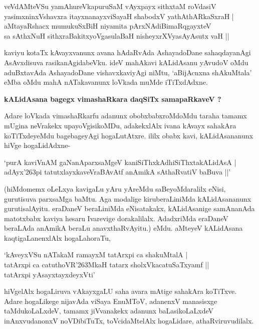 \begin{shloka}
veVdAMteVSu yamAhureVkapuruSaM vAyxpayx sithxtaM roVdasiV\\
yasimxninxVshavxra itayxnanayxviSayaH shabodxV yathAthARkaSxraH |\\
aMtayaRshacx mumukuSxBiH niyamita pArxNAdiBimaRqgayxteV \\
sa sAthxNuH sithxraBakitxyoVgasulaBaH nisheyxrXVyasAyAsutx vaH ||
\end{shloka}

kaviyu kotaTx kAvayxvanunx avana hAdaRvAda AshayadoDane sahaqdayanAgi AsAvxdisuva rasikanAgidabeVku. ideV mahAkavi kALidAsanu yAvudoV oMdu aduBxtavAda AshayadoDane vishavxkaviyAgi niMtu, `aBijAcnxna shAkuMtala' eMba oMdu mahA nATakavanunx loVkada muMde iTiTxdAdxne.

{\bf kALidAsana bagegx vimashaRkara daqSiTx samapaRkaveV ?}

Adare loVkada vimashaRkarfu adanunx obobxbabxroMdoMdu taraha tamamx mUgina neVrakekx upayoVgisikoMDu, adakekxlAlx ivana kAvayx sahakAra koTiTxdeyeMdu bagebageyAgi hogaLutAtxre. ililx obabx kavi, kALidAsananunx hiVge hogaLidAdxne-

\begin{shloka}
`purA kaviVnAM gaNanAparxsaMgeV kaniSiThxkAdhiSiThxtakALidAsA |\\
adAyx\char'263pi tatutxlayxkaveVraBAvAtf anAmikA sAthaRvatiV baBuva ||'
\end{shloka}

(hiMdomemx oLeLxya kavigaLu yAru yAreMdu saBeyoMdaralilx eNisi, gurutisuva parxsaMga baMtu. Aga modalige kiruberaLiniMda kALidAsananunx gurutisalAyitu. eraDaneV beraLiniMda eNisatakakx, kALidAsanige samAnanAda matotxbabx kaviya hesaru Ivarevige dorakalilalx. AdadxriMda eraDaneV beraLAda anAmikA beraLu anavxthaRvAyitu.) eMdu. aMteyeV kALidAsana kaqtigaLanenxlAlx hogaLahoraTu,

\begin{shloka}
`kAveyxVSu nATakaM ramayxM tatArxpi ca shakuMtalA |\\
tatArxpi ca catuthoVR\char'263MkaH tatarx sholxVkacatuSaTxyamf ||\\
tatArxpi yAsayxtayxdeyxVti'
\end{shloka}

hiVgelAlx hogaLiruva vAkayxgaLU saha avara mAtige sahakAra koTiTxve. Adare hogaLikege nijavAda viSaya EnuMToV, adanenxV manasisxge taMdukoLaLxdeV, tamamx jiVvanakekx adanunx baLasikoLaLxdeV inAnxvudanonxV noVDibiTuTx, toVcidaMtelAlx hogaLidare, athaRviruvudilalx.

